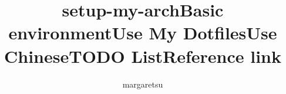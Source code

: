 \documentclass{article}
\begin{document}
\title{setup-my-arch}
\maketitle
\author{margaretsu}

\title{Basic environment}


\title{Use My Dotfiles}


\title{Use Chinese}

\title{TODO List}

\title{Reference link}
\end{document}
